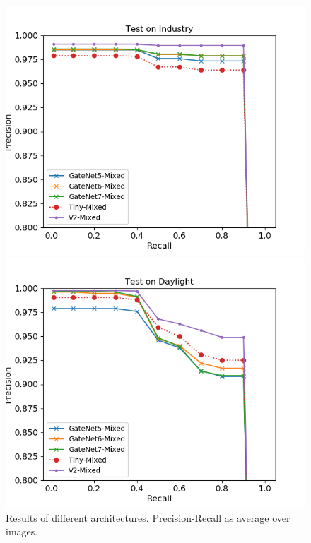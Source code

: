 \documentclass{article}
\begin{document}
\begin{figure}
	\centering
	\begin{minipage}{0.45\linewidth}
		\includegraphics[width=\linewidth]{fig/pr_industry_tuning}
	\end{minipage}
	\begin{minipage}{0.45\linewidth}
		\includegraphics[width=\linewidth]{fig/pr_daylight_tuning}
	\end{minipage}
\caption{Results of different architectures. Precision-Recall as average over images.}
\label{fig:results2}
\end{figure}
\end{document}
